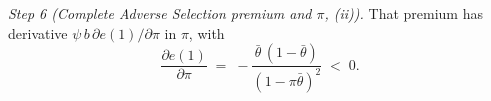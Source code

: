 \emph{Step 6 (Complete Adverse Selection premium and $\pi$, (ii)).} That premium has derivative $\psi\,b\,\partial e(1)/\partial\pi$ in $\pi$, with
\begin{equation*}
    \frac{\partial e(1)}{\partial\pi}\;=\;-\frac{\bar\theta\,(1-\bar\theta)}{(1-\pi\bar\theta)^2}\;<\;0 .
\end{equation*}
